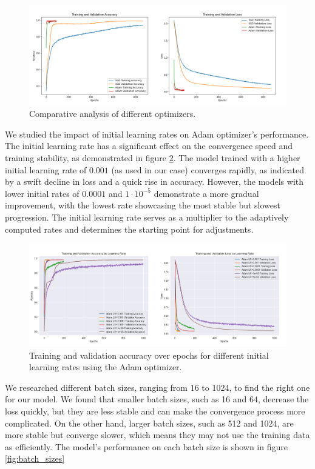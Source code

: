 \begin{figure}[ht!]
	\centering
	\includegraphics[width=\textwidth]{images/optimizers_comparison.png}
	\caption{Comparative analysis of different optimizers.}
	\label{fig:optimizers}
\end{figure}


We studied the impact of initial learning rates on Adam optimizer's performance. The initial learning rate has a significant effect on the convergence speed and training stability, as demonstrated in figure \ref{fig:learning_rates}.\newline
The model trained with a higher initial learning rate of $0.001$ (as used in our case) converges rapidly, as indicated by a swift decline in loss and a quick rise in accuracy. However, the models with lower initial rates of $0.0001$ and $1\cdot10^{-5}$ demonstrate a more gradual improvement, with the lowest rate showcasing the most stable but slowest progression.\newline
The initial learning rate serves as a multiplier to the adaptively computed rates and determines the starting point for adjustments.
\begin{figure}[ht!]
	\centering
	\includegraphics[width=\textwidth]{images/adam_learning_rates_comparison.png}
	\caption{Training and validation accuracy over epochs for different initial learning rates using the Adam optimizer.}
	\label{fig:learning_rates}
\end{figure}

We researched different batch sizes, ranging from 16 to 1024, to find the right one for our model. We found that smaller batch sizes, such as 16 and 64, decrease the loss quickly, but they are less stable and can make the convergence process more complicated. On the other hand, larger batch sizes, such as 512 and 1024, are more stable but converge slower, which means they may not use the training data as efficiently. The model's performance on each batch size is shown in figure \ref{fig:batch_sizes}

